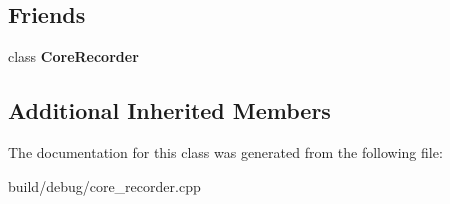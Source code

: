 \subsection*{Friends}
\begin{DoxyCompactItemize}
\item 
\hypertarget{classTimingCoreEvent_ad11c4bb95416c8910bf7ba0f6af58867}{class {\bfseries Core\-Recorder}}\label{classTimingCoreEvent_ad11c4bb95416c8910bf7ba0f6af58867}

\end{DoxyCompactItemize}
\subsection*{Additional Inherited Members}


The documentation for this class was generated from the following file\-:\begin{DoxyCompactItemize}
\item 
build/debug/core\-\_\-recorder.\-cpp\end{DoxyCompactItemize}
